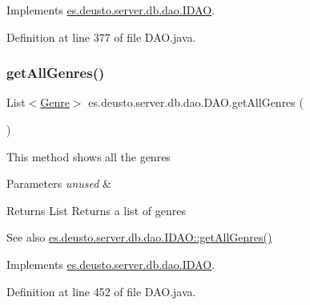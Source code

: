 Implements \hyperlink{interfacees_1_1deusto_1_1server_1_1db_1_1dao_1_1_i_d_a_o_aebafef372cf3064b12d16fcb651b41ff}{es.\+deusto.\+server.\+db.\+dao.\+I\+D\+AO}.



Definition at line 377 of file D\+A\+O.\+java.

\mbox{\label{classes_1_1deusto_1_1server_1_1db_1_1dao_1_1_d_a_o_ac1cb7032ef21f53dead8347ef440f431}} 
\subsubsection{\texorpdfstring{get\+All\+Genres()}{getAllGenres()}}
{\footnotesize\ttfamily List$<$\hyperlink{classes_1_1deusto_1_1server_1_1db_1_1data_1_1_genre}{Genre}$>$ es.\+deusto.\+server.\+db.\+dao.\+D\+A\+O.\+get\+All\+Genres (\begin{DoxyParamCaption}{ }\end{DoxyParamCaption})}

This method shows all the genres 
\begin{DoxyParams}{Parameters}
{\em unused} & \\
\hline
\end{DoxyParams}
\begin{DoxyReturn}{Returns}
List Returns a list of genres 
\end{DoxyReturn}
\begin{DoxySeeAlso}{See also}
\hyperlink{interfacees_1_1deusto_1_1server_1_1db_1_1dao_1_1_i_d_a_o_a96ad8de066318847a7828b12befe94f7}{es.\+deusto.\+server.\+db.\+dao.\+I\+D\+A\+O\+::get\+All\+Genres()} 
\end{DoxySeeAlso}


Implements \hyperlink{interfacees_1_1deusto_1_1server_1_1db_1_1dao_1_1_i_d_a_o_a96ad8de066318847a7828b12befe94f7}{es.\+deusto.\+server.\+db.\+dao.\+I\+D\+AO}.



Definition at line 452 of file D\+A\+O.\+java.

\mbox{\label{classes_1_1deusto_1_1server_1_1db_1_1dao_1_1_d_a_o_a9c59f6c4bf89f46e305f88a4f8eb96bc}} 
